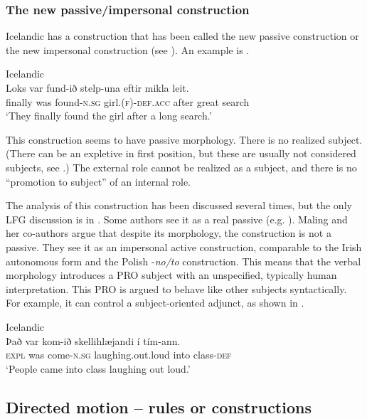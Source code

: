 \documentclass[output=paper,hidelinks]{langscibook}
\begin{document}
\subsubsection{The new passive/impersonal construction}

Icelandic has a construction that has been called the new passive construction or the new impersonal construction (see \citealt{MS02}). An example is .



\ea\label{ex:Scandinavian:93} Icelandic \citep{KM15}\\
\gll
 {Loks} {var} {fund-ið} {stelp-una} {eftir} {mikla} {leit}.\\
 finally was found-\textsc{n}.\textsc{sg} girl.(\textsc{f)}{}-\textsc{def}.\textsc{acc} after great search\\
\glt `They finally found the girl after a long search.'\z

\noindent This construction seems to have passive morphology. There is no realized subject. (There can be an expletive in first position, but these are usually not considered subjects, see .) The external role cannot be realized as a subject, and there is no ``promotion to subject'' of an internal role.

 The analysis of this construction has been discussed several times, but the only LFG discussion is in \citet{KM15}. Some authors see it as a real passive (e.g. \citealt{Eythorsson08}). Maling and her co-authors argue that despite its morphology, the construction is not a passive. They see it as an impersonal active construction, comparable to the Irish autonomous form and the Polish -\textit{no/to} construction. This means that the verbal morphology introduces a PRO subject with an unspecified, typically human interpretation. This PRO is argued to behave like other subjects syntactically. For example, it can control a subject-oriented adjunct, as shown in .



\ea\label{ex:Scandinavian:94} Icelandic \citep[125]{MS02}\\
\gll
 {Það} {var} {kom-ið} {skellihlæjandi} {í} {tím-ann.} \\
 \textsc{expl} was come-\textsc{n.sg} laughing.out.loud into class-\textsc{def} \\
\glt `People came into class laughing out loud.'\z

\subsection{Directed motion -- rules or constructions}
\end{document}
